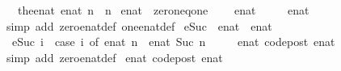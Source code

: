 \begin{isabellebody}
\ \ \ {\isachardoublequoteopen}the{\isacharunderscore}enat\ {\isacharparenleft}enat\ n{\isacharparenright}\ {\isacharequal}\ n{\isachardoublequoteclose}%
\isadelimdocument
%
\endisadelimdocument
%
\isatagdocument
%
\isamarkuptrue%
%
\endisatagdocument
{\isafolddocument}%
%
\isadelimdocument
%
\endisadelimdocument
{}\isamarkupfalse%
\ enat\ {\isacharcolon}{\isacharcolon}\ zero{\isacharunderscore}neq{\isacharunderscore}one\isanewline
{}\isanewline
\isanewline
{}\isamarkupfalse%
\isanewline
\ \ {\isachardoublequoteopen}{}\ {\isacharequal}\ enat\ {}{\isachardoublequoteclose}\isanewline
\isanewline
{}\isamarkupfalse%
\isanewline
\ \ {\isachardoublequoteopen}{}\ {\isacharequal}\ enat\ {}{\isachardoublequoteclose}\isanewline
\isanewline
{}\isamarkupfalse%
\isanewline
%
\isadelimproof
\ \ %
\endisadelimproof
%
\isatagproof
{}\isamarkupfalse%
\ \isamarkupfalse%
\ {\isacharparenleft}simp\ add{\isacharcolon}\ zero{\isacharunderscore}enat{\isacharunderscore}def\ one{\isacharunderscore}enat{\isacharunderscore}def{\isacharparenright}%
\endisatagproof
{\isafoldproof}%
%
\isadelimproof
\isanewline
%
\endisadelimproof
\isanewline
{}\isamarkupfalse%
\isanewline
\isanewline
{}\isamarkupfalse%
\ eSuc\ {\isacharcolon}{\isacharcolon}\ {\isachardoublequoteopen}enat\ {\isasymRightarrow}\ enat{\isachardoublequoteclose}\ \isanewline
\ \ {\isachardoublequoteopen}eSuc\ i\ {\isacharequal}\ {\isacharparenleft}case\ i\ of\ enat\ n\ {\isasymRightarrow}\ enat\ {\isacharparenleft}Suc\ n{\isacharparenright}\ {\isacharbar}\ {\isasyminfinity}\ {\isasymRightarrow}\ {\isasyminfinity}{\isacharparenright}{\isachardoublequoteclose}\isanewline
\isanewline
{}\isamarkupfalse%
\ enat{\isacharunderscore}{}\ {\isacharbrackleft}code{\isacharunderscore}post{\isacharbrackright}{\isacharcolon}\ {\isachardoublequoteopen}enat\ {}\ {\isacharequal}\ {}{\isachardoublequoteclose}\isanewline
%
\isadelimproof
\ \ %
\endisadelimproof
%
\isatagproof
{}\isamarkupfalse%
\ {\isacharparenleft}simp\ add{\isacharcolon}\ zero{\isacharunderscore}enat{\isacharunderscore}def{\isacharparenright}%
\endisatagproof
{\isafoldproof}%
%
\isadelimproof
\isanewline
%
\endisadelimproof
\isanewline
{}\isamarkupfalse%
\ enat{\isacharunderscore}{}\ {\isacharbrackleft}code{\isacharunderscore}post{\isacharbrackright}{\isacharcolon}\ {\isachardoublequoteopen}enat\ {}\ {\isacharequal}\ {}{\isachardoublequoteclose}\isanewline

\end{isabellebody}
